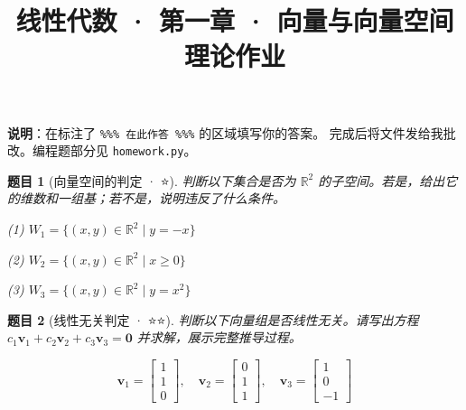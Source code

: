 \documentclass[12pt]{ctexart}
\title{线性代数 · 第一章 · 向量与向量空间 \\ 理论作业}
\author{}
\date{}
\newtheorem{problem}{题目}
\begin{document}
\maketitle

\begin{center}
\textbf{说明}：在标注了 \texttt{\%\%\% 在此作答 \%\%\%} 的区域填写你的答案。
完成后将文件发给我批改。编程题部分见 \texttt{homework.py}。
\end{center}

\begin{problem}[向量空间的判定 · ⭐]
判断以下集合是否为 $\mathbb{R}^2$ 的子空间。若是，给出它的维数和一组基；若不是，说明违反了什么条件。

(1) $W_1 = \{(x, y) \in \mathbb{R}^2 \mid y = -x\}$

(2) $W_2 = \{(x, y) \in \mathbb{R}^2 \mid x \geq 0\}$

(3) $W_3 = \{(x, y) \in \mathbb{R}^2 \mid y = x^2\}$
\end{problem}










\begin{problem}[线性无关判定 · ⭐⭐]
判断以下向量组是否线性无关。请写出方程 $c_1\mathbf{v}_1 + c_2\mathbf{v}_2 + c_3\mathbf{v}_3 = \mathbf{0}$ 并求解，展示完整推导过程。

\[
\mathbf{v}_1 = \begin{bmatrix} 1 \\ 1 \\ 0 \end{bmatrix},\quad
\mathbf{v}_2 = \begin{bmatrix} 0 \\ 1 \\ 1 \end{bmatrix},\quad
\mathbf{v}_3 = \begin{bmatrix} 1 \\ 0 \\ -1 \end{bmatrix}
\]

\end{problem}

\end{document}
